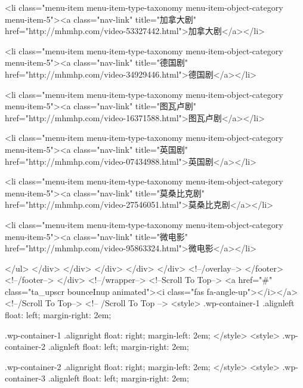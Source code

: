                             <li class="menu-item menu-item-type-taxonomy menu-item-object-category menu-item-5"><a class="nav-link" title="加拿大剧" href="http://mhmhp.com/video-53327442.html">加拿大剧</a></li>
                            
                            <li class="menu-item menu-item-type-taxonomy menu-item-object-category menu-item-5"><a class="nav-link" title="德国剧" href="http://mhmhp.com/video-34929446.html">德国剧</a></li>
                            
                            <li class="menu-item menu-item-type-taxonomy menu-item-object-category menu-item-5"><a class="nav-link" title="图瓦卢剧" href="http://mhmhp.com/video-16371588.html">图瓦卢剧</a></li>
                            
                            <li class="menu-item menu-item-type-taxonomy menu-item-object-category menu-item-5"><a class="nav-link" title="英国剧" href="http://mhmhp.com/video-07434988.html">英国剧</a></li>
                            
                            <li class="menu-item menu-item-type-taxonomy menu-item-object-category menu-item-5"><a class="nav-link" title="莫桑比克剧" href="http://mhmhp.com/video-27546051.html">莫桑比克剧</a></li>
                            
                            <li class="menu-item menu-item-type-taxonomy menu-item-object-category menu-item-5"><a class="nav-link" title="微电影" href="http://mhmhp.com/video-95863324.html">微电影</a></li>
                            
                        </ul>
                    </div>
                </div>
            </div>
        </div>
    </div>
    <!--/overlay-->
</footer>
            <!--/footer-->
        </div>
        <!--/wrapper-->
        <!--Scroll To Top-->
        <a href="#" class="ta_upscr bounceInup animated"><i class="fas fa-angle-up"></i></a>
        <!--/Scroll To Top-->
        <!-- /Scroll To Top -->
        <style>
            .wp-container-1 .alignleft {
                float: left;
                margin-right: 2em;
            }

            .wp-container-1 .alignright {
                float: right;
                margin-left: 2em;
            }
        </style>
        <style>
            .wp-container-2 .alignleft {
                float: left;
                margin-right: 2em;
            }

            .wp-container-2 .alignright {
                float: right;
                margin-left: 2em;
            }
        </style>
        <style>
            .wp-container-3 .alignleft {
                float: left;
                margin-right: 2em;
            }

